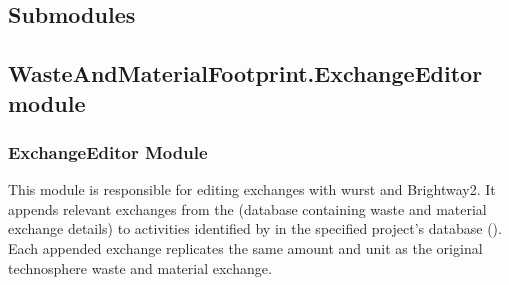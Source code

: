 \documentclass[letterpaper,10pt,english]{sphinxmanual}
\begin{document}
\subsection{Submodules}
\label{\detokenize{WasteAndMaterialFootprint:submodules}}

\subsection{WasteAndMaterialFootprint.ExchangeEditor module}
\label{\detokenize{WasteAndMaterialFootprint:module-WasteAndMaterialFootprint.ExchangeEditor}}\label{\detokenize{WasteAndMaterialFootprint:wasteandmaterialfootprint-exchangeeditor-module}}

\subsubsection{ExchangeEditor Module}
\label{\detokenize{WasteAndMaterialFootprint:exchangeeditor-module}}
\sphinxAtStartPar
This module is responsible for editing exchanges with wurst and Brightway2.
It appends relevant exchanges from the  (database containing waste and material exchange details) 
to activities identified by  in the specified project’s database ().
Each appended exchange replicates the same amount and unit as the original technosphere waste and material exchange.
\end{document}
